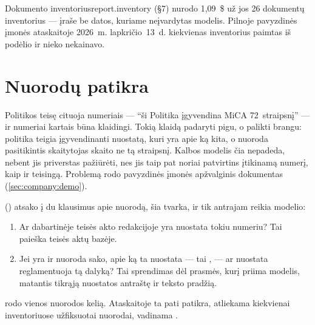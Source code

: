 \begin{pathcard}{Dokumento inventorius}{report.inventory}
{     (§7) nurodo 1,09~\$ už jos 26 dokumentų inventorius ---
    įraše be datos, kuriame neįvardytas modelis. Pilnoje pavyzdinės įmonės ataskaitoje
    2026~m. lapkričio~13~d. kiekvienas inventorius paimtas iš podėlio ir nieko nekainavo.}
\end{pathcard}


\section{Nuorodų patikra}\label{sec:company:check}

Politikos teisę cituoja numeriais --- \enquote{ši Politika įgyvendina MiCA 72~straipsnį} ---
ir numeriai kartais būna klaidingi. Tokią klaidą padaryti pigu, o palikti brangu: politika
teigia įgyvendinanti nuostatą, kuri yra apie ką kita, o nuoroda pasitikintis skaitytojas skaito
ne tą straipsnį. Kalbos modelis čia nepadeda, nebent jis priverstas pažiūrėti, nes jis taip pat
noriai patvirtins įtikinamą numerį, kaip ir teisingą. Problemą rodo pavyzdinės įmonės apžvalginis
dokumentas (\cref{sec:company:demo}).

 () atsako į du klausimus apie nuorodą, šia
tvarka, ir tik antrajam reikia modelio:

\begin{enumerate}
  \item Ar dabartinėje teisės akto redakcijoje yra nuostata tokiu numeriu? Tai paieška teisės
    aktų bazėje.
  \item Jei yra ir nuoroda sako, apie ką ta nuostata --- tai , --- ar nuostata
    reglamentuoja tą dalyką? Tai sprendimas dėl prasmės, kurį priima modelis, matantis tikrąją
    nuostatos antraštę ir teksto pradžią.
\end{enumerate}

 rodo vienos nuorodos kelią. Ataskaitoje ta pati patikra, atliekama
kiekvienai inventoriuose užfiksuotai nuorodai, vadinama .


